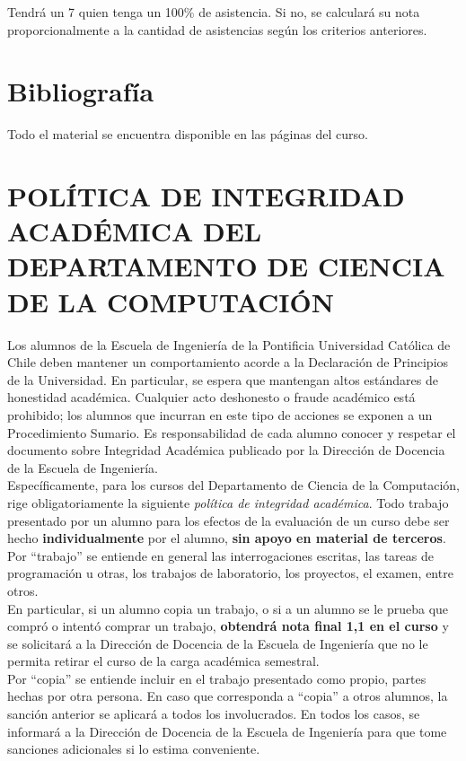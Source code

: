 \documentclass[10pt,letterpaper]{extarticle}
\begin{document}
Tendrá un 7 quien tenga un 100\% de asistencia. Si no, se calculará su nota proporcionalmente
a la cantidad de asistencias según los criterios anteriores.

\section*{Bibliografía}
\noindent
Todo el material se encuentra disponible en las páginas del curso.

\section*{POLÍTICA DE INTEGRIDAD ACADÉMICA DEL DEPARTAMENTO DE CIENCIA DE LA
COMPUTACIÓN} Los alumnos de la Escuela de Ingeniería de la Pontificia
Universidad Católica de Chile deben mantener un comportamiento acorde a la
Declaración de Principios de la Universidad.  En particular, se espera que
mantengan altos estándares de honestidad académica.  Cualquier acto deshonesto
o fraude académico está prohibido; los alumnos que incurran en este tipo de
acciones se exponen a un Procedimiento Sumario. Es responsabilidad de cada
alumno conocer y respetar el documento sobre Integridad Académica publicado por
la Dirección de Docencia de la Escuela de Ingeniería.\\

Específicamente, para los cursos del Departamento de Ciencia de la Computación,
rige obligatoriamente la siguiente \emph{política de integridad académica}.
Todo trabajo presentado por un alumno para los efectos de la evaluación de un
curso debe ser hecho \textbf{individualmente} por el alumno, \textbf{sin apoyo
en material de terceros}.  Por ``trabajo'' se entiende en general las
interrogaciones escritas, las tareas de programación u otras, los trabajos de
laboratorio, los proyectos, el examen, entre otros.\\

En particular, si un alumno copia un trabajo, o si a un alumno se le prueba que
compró o intentó comprar un trabajo, \textbf{obtendrá nota final 1,1 en el
curso} y se solicitará a la Dirección de Docencia de la Escuela de Ingeniería
que no le permita retirar el curso de la carga académica semestral.\\

Por ``copia'' se entiende incluir en el trabajo presentado como propio, partes
hechas por otra persona.  En caso que corresponda a ``copia'' a otros alumnos,
la sanción anterior se aplicará a todos los involucrados.  En todos los casos,
se informará a la Dirección de Docencia de la Escuela de Ingeniería para que
tome sanciones adicionales si lo estima conveniente.\\
\end{document}
